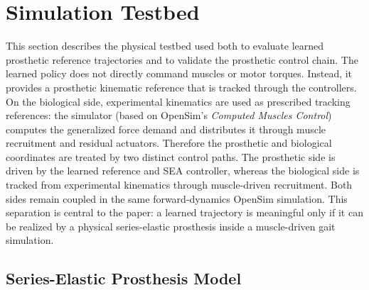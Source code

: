 \section{Simulation Testbed}
\label{sec:simulation-testbed}


\noindent 
This section describes the physical testbed used both to evaluate learned
prosthetic reference trajectories and to validate the prosthetic control chain.
The learned policy does not directly command muscles or motor torques.
Instead, it provides a prosthetic kinematic reference that is tracked through the
controllers. On the biological side,
experimental kinematics are used as prescribed tracking references: the simulator (based on OpenSim's \textit{Computed Muscles Control}) computes the generalized force demand and distributes it through muscle recruitment and residual actuators. Therefore the prosthetic and biological coordinates are treated by two distinct control paths. The prosthetic side is driven by the
learned reference and SEA controller, whereas the biological side is tracked from
experimental kinematics through muscle-driven recruitment. Both sides remain
coupled in the same forward-dynamics OpenSim simulation. This separation is
central to the paper: a learned trajectory is meaningful only if it can be
realized by a physical series-elastic prosthesis inside a muscle-driven gait
simulation.

\subsection{Series-Elastic Prosthesis Model}
\label{subsec:sea-model}

